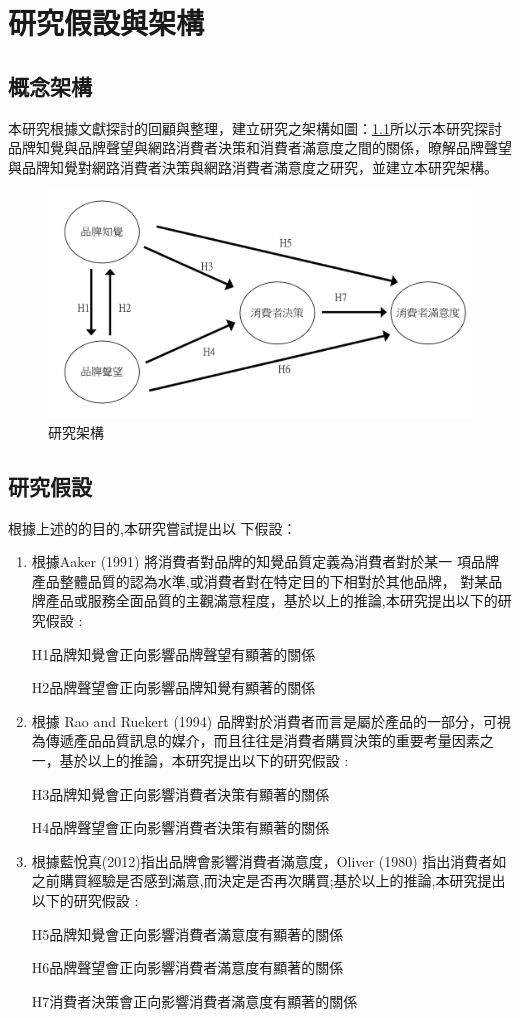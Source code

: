 \chapter{研究假設與架構}
\section{概念架構}
本研究根據文獻探討的回顧與整理，建立研究之架構如圖：\ref{fig:ARC}所以示本研究探討品牌知覺與品牌聲望與網路消費者決策和消費者滿意度之間的關係，暸解品牌聲望與品牌知覺對網路消費者決策與網路消費者滿意度之研究，並建立本研究架構。


\begin{figure}[h]
\centering
\includegraphics[width=14cm]{images/論文架構.png}
\caption{研究架構}
\label{fig:ARC}
\end{figure}

\section{研究假設}
根據上述的的目的,本研究嘗試提出以 下假設：
\begin{enumerate}
\item 根據Aaker (1991) 將消費者對品牌的知覺品質定義為消費者對於某一 項品牌產品整體品質的認為水準,或消費者對在特定目的下相對於其他品牌， 對某品牌產品或服務全面品質的主觀滿意程度，基於以上的推論,本研究提出以下的研究假設 :

H1品牌知覺會正向影響品牌聲望有顯著的關係

H2品牌聲望會正向影響品牌知覺有顯著的關係

\item 根據 Rao and Ruekert (1994) 品牌對於消費者而言是屬於產品的一部分，可視為傳遞產品品質訊息的媒介，而且往往是消費者購買決策的重要考量因素之一，基於以上的推論，本研究提出以下的研究假設 :

H3品牌知覺會正向影響消費者決策有顯著的關係

H4品牌聲望會正向影響消費者決策有顯著的關係

\item 根據藍悅真(2012)指出品牌會影響消費者滿意度，Oliver (1980) 指出消費者如之前購買經驗是否感到滿意,而決定是否再次購買;基於以上的推論,本研究提出以下的研究假設 :

H5品牌知覺會正向影響消費者滿意度有顯著的關係

H6品牌聲望會正向影響消費者滿意度有顯著的關係

H7消費者決策會正向影響消費者滿意度有顯著的關係

\end{enumerate}

